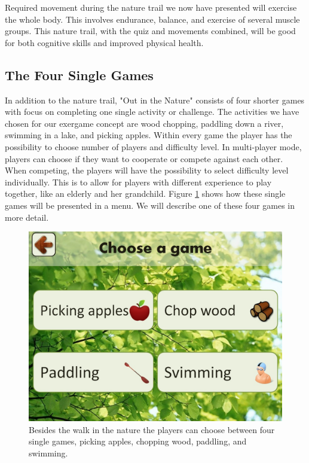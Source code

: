 Required movement during the nature trail we now have presented will exercise the whole body. This involves endurance, balance, and exercise of several muscle groups. This nature trail, with the quiz and movements combined, will be good for both cognitive skills and improved physical health.     


\subsection{The Four Single Games}
In addition to the nature trail, "Out in the Nature" consists of four shorter games with focus on completing one single activity or challenge. The activities we have chosen for our exergame concept are wood chopping, paddling down a river, swimming in a lake, and picking apples. Within every game the player has the possibility to choose number of players and difficulty level. In multi-player mode, players can choose if they want to cooperate or compete against each other. When competing, the players will have the possibility to select difficulty level individually. This is to allow for players with different experience to play together, like an elderly and her grandchild. Figure \ref{fig:velgSpill} shows how these single games will be presented in a menu. We will describe one of these four games in more detail.

\begin{figure} [H]
\centering
\includegraphics[scale=0.4]{chooseGame.jpg}
\caption[The four single games]{Besides the walk in the nature the players can choose between four single games, picking apples, chopping wood, paddling, and swimming.}
\label{fig:velgSpill}
\end{figure}

